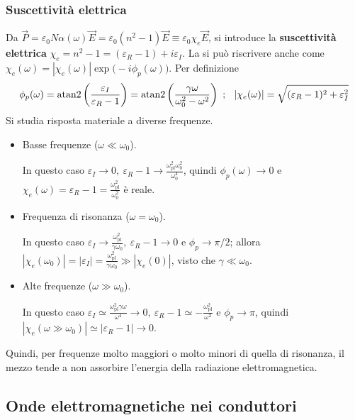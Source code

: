 \documentclass[10pt, a4paper]{scrartcl}
\numberwithin{equation}{subsection}
\theoremstyle{style1}
\begin{document}
\subsubsection{Suscettivit\`a elettrica}
Da $\vec{P}=\varepsilon _0 N\alpha (\omega)\vec{E}= \varepsilon _0(n^2 -1) \vec{E}\equiv \varepsilon_0 \chi _e \vec{E}$, si introduce la \textbf{suscettivit\`a elettrica} $\chi _e=n^2-1 = (\varepsilon _R-1) + i \varepsilon _I$. La si pu\`o riscrivere anche come $\chi _e(\omega) = \left\lvert \chi _e(\omega) \right\rvert \exp\big(-i\phi _p(\omega)\big)$. Per definizione
\begin{equation}
	\phi _p(\omega)=\operatorname{atan2}\left(\frac{\varepsilon _I}{\varepsilon _R -1}\right)  = \operatorname{atan2} \left(\frac{\gamma\omega}{\omega_0^2 - \omega^2}\right)  \ ;\hspace{.25cm} \left\lvert \chi _e(\omega) \right\rvert = \sqrt{(\varepsilon _R -1)^2 + \varepsilon _I^2} 
\end{equation}
Si studia risposta materiale a diverse frequenze.
\begin{itemize}
	\item Basse frequenze ($\omega\ll\omega_0$).

		In questo caso $\varepsilon _I \to 0, \ \varepsilon _R -1 \to \frac{\omega_\text{pl}^2 \omega_0^2}{\omega_0^4}$, quindi $\phi _p(\omega) \to 0$ e $\chi _e (\omega)=\varepsilon _R -1=\frac{\omega_\text{pl}^2}{\omega_0^2}$ \`e reale.
	\item Frequenza di risonanza ($\omega=\omega_0$).

		In questo caso $\varepsilon _I \to \frac{\omega_\text{pl}^2}{\gamma\omega_0}, \ \varepsilon _R -1 \to 0$ e $\phi _p \to \pi / 2$; allora $\left\lvert \chi _e(\omega_0) \right\rvert = \left\lvert \varepsilon _I \right\rvert = \frac{\omega_\text{pl}^2}{\gamma\omega_0} \gg \left\lvert \chi _e (0) \right\rvert $, visto che $\gamma\ll\omega_0$.
	\item Alte frequenze ($\omega \gg \omega_0$).

		In questo caso $\varepsilon _I \simeq \frac{\omega_\text{pl}^2 \gamma \omega}{\omega^4} \to 0, \ \varepsilon _R -1 \simeq - \frac{\omega_\text{pl}^2 }{\omega^2}$ e $\phi _p \to \pi$, quindi $\left\lvert \chi _e(\omega \gg\omega_0) \right\rvert \simeq \left\lvert \varepsilon _R -1 \right\rvert \to 0$.
\end{itemize}
Quindi, per frequenze molto maggiori o molto minori di quella di risonanza, il mezzo tende a non assorbire l'energia della radiazione elettromagnetica.
\subsection{Onde elettromagnetiche nei conduttori}
\end{document}
